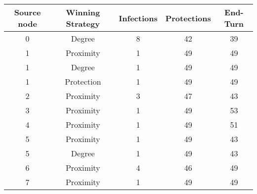 \documentclass[results.tex]{subfiles}
\begin{document}
    \begin{center}
        \begin{tabular}{| c || c | c | c | c |}
            \hline
            {\bfseries Source node} & {\bfseries Winning Strategy} & {\bfseries Infections} & {\bfseries Protections}
            & {\bfseries End-Turn}
            \\  %
            \hline\hline
            0                       & Degree                       & 8                      & 42                      & 39                   \\
            \hline
            1                       & Proximity                    & 1                      & 49                      & 49                   \\
            \hline
            1                       & Degree                       & 1                      & 49                      & 49                   \\
            \hline
            1                       & Protection                   & 1                      & 49                      & 49                   \\
            \hline
            2                       & Proximity                    & 3                      & 47                      & 43                   \\
            \hline
            3                       & Proximity                    & 1                      & 49                      & 53                   \\
            \hline
            4                       & Proximity                    & 1                      & 49                      & 51                   \\
            \hline
            5                       & Proximity                    & 1                      & 49                      & 43                   \\
            \hline
            5                       & Degree                       & 1                      & 49                      & 43                   \\
            \hline
            6                       & Proximity                    & 4                      & 46                      & 49                   \\
            \hline
            7                       & Proximity                    & 1                      & 49                      & 49                   \\

\end{tabular}
\end{center}
\end{document}
